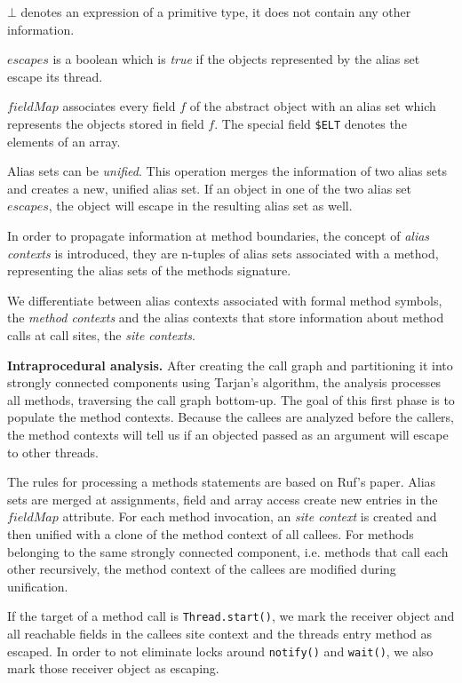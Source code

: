 \documentclass[letterpaper]{article}
\newcommand{\mypar}[1]{{\bf #1.}}
\begin{document}
$\bot$ denotes an expression of a primitive type, it does not contain any other information.

$escapes$ is a boolean which is \emph{true} if the objects represented by the alias set escape its thread.

$fieldMap$ associates every field $f$ of the abstract object with an alias set which represents the objects stored in field $f$.
The special field \texttt{\$ELT} denotes the elements of an array.

Alias sets can be \emph{unified}. This operation merges the information of two alias sets and creates a new, unified alias set.
If an object in one of the two alias set $escapes$, the object will escape in the resulting alias set as well.

In order to propagate information at method boundaries, the concept of \emph{alias contexts} is introduced, they
are n-tuples of alias sets associated with a method, representing the alias sets of the methods signature.

We differentiate between alias contexts associated with formal method symbols, the \emph{method contexts} and the
alias contexts that store information about method calls at call sites, the \emph{site contexts}.

\mypar{Intraprocedural analysis} After creating the call graph and partitioning it 
into strongly connected components using Tarjan's algorithm, the analysis processes all methods,
traversing the call graph bottom-up. The goal of this first phase is to populate the
method contexts. Because the callees are analyzed before the callers, the method
contexts will tell us if an objected passed as an argument will escape to other threads.

The rules for processing a methods statements are based on Ruf's \cite{Ruf:00} paper. Alias sets are merged
at assignments, field and array access create new entries in the $fieldMap$ attribute. 
For each method invocation, an \emph{site context} is created and then unified with
a clone of the method context of all callees. For methods belonging to the same strongly connected component, i.e.
methods that call each other recursively, the method context of the callees are modified during unification.

If the target of a method call is \texttt{Thread.start()}, we mark the receiver object and all reachable fields
in the callees site context and the threads entry method as escaped.
In order to not eliminate locks around \texttt{notify()} and \texttt{wait()}, we also mark those receiver
object as escaping. 
\end{document}
